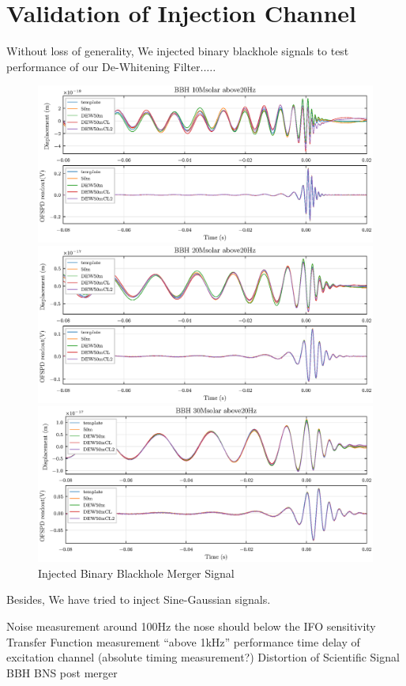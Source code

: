 




\chapter{Validation of Injection Channel}

Without loss of generality, We injected binary blackhole   signals to test performance of our De-Whitening Filter.....

  

\begin{figure}[hbt!]
\centering
\includegraphics[width=\textwidth]{figure/inj/10.eps}


\includegraphics[width=\textwidth]{figure/inj/20.eps}


\includegraphics[width=\textwidth]{figure/inj/30.eps}
\caption{Injected Binary Blackhole Merger Signal}\label{fig:dewcircuit}
\end{figure}


Besides, We have tried to inject Sine-Gaussian signals.




Noise measurement
around 100Hz  the nose should below the IFO sensitivity
Transfer Function measurement
“above 1kHz” performance
time delay of excitation channel
(absolute timing measurement?)
Distortion of Scientific Signal
BBH
BNS post merger



